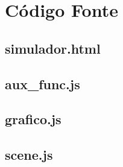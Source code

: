 \chapter{Código Fonte}
\section{simulador.html}


\section{aux\_func.js}


\section{grafico.js}


\section{scene.js}
